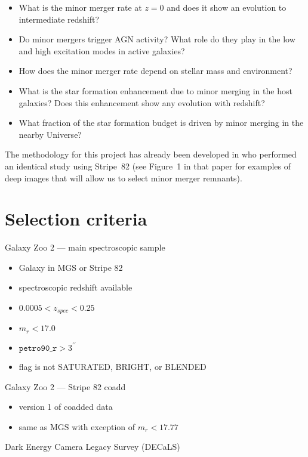\documentclass[iop,apj,tighten]{emulateapj}
\begin{document}
\begin{enumerate}
    \begin{itemize}
        \item What is the minor merger rate at $z = 0$ and does it show an evolution to intermediate redshift?
        \item Do minor mergers trigger AGN activity? What role do they play in the low and high excitation modes in active galaxies?
        \item How does the minor merger rate depend on stellar mass and environment?
        \item What is the star formation enhancement due to minor merging in the host galaxies? Does this enhancement show any evolution with redshift?
        \item What fraction of the star formation budget is driven by minor merging in the nearby Universe?
    \end{itemize}
    The methodology for this project has already been developed in \citet{kav14a} who performed an identical study using Stripe~82 (see Figure~1 in that paper for examples of deep images that will allow us to select minor merger remnants).
\end{enumerate}

\section{Selection criteria}

Galaxy Zoo 2 --- main spectroscopic sample

\begin{itemize}
    \item Galaxy in MGS or Stripe 82
    \item spectroscopic redshift available
    \item $0.0005 < z_{spec} < 0.25$
    \item $m_r < 17.0$
    \item $\texttt{petro90\_r} > 3^{\prime\prime}$
    \item flag is not SATURATED, BRIGHT, or BLENDED
\end{itemize}

Galaxy Zoo 2 --- Stripe 82 coadd

\begin{itemize}
    \item version 1 of coadded data
    \item same as MGS with exception of $m_r < 17.77$
\end{itemize}

Dark Energy Camera Legacy Survey (DECaLS)
\end{document}
